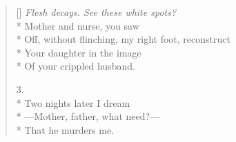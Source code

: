 \begin{verse}[\versewidth]
\textit{Flesh decays. See these white spots?}\\*
Mother and nurse, you saw\\*
Off, without flinching, my right foot, reconstruct\\*
Your daughter in the image\\*
Of your crippled husband.

3.\\*
Two nights later I dream\\*
---Mother, father, what need?---\\*
That he murders me.
\end{verse}
